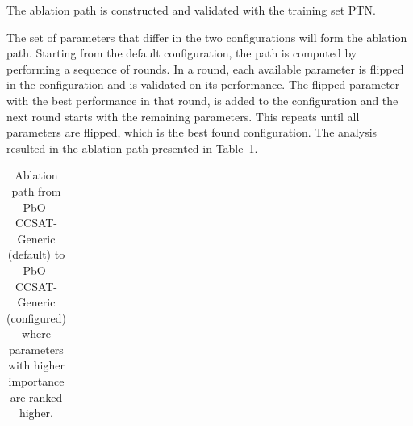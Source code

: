 \documentclass[british]{article}
\newif\iftest
\newif\ifablation
\begin{document}
\ifablation
    \section{Parameter importance via Ablation}

    Ablation analysis~\cite{FawcettHoos16} is performed from the PbO-CCSAT-Generic (default) to PbO-CCSAT-Generic (configured) to see which parameter changes between them contribute most to the improved performance.
    \iftest
    The ablation path uses the training set PTN and validation is perform on the test set PTN2.
    \else
    The ablation path is constructed and validated with the training set PTN.
    \fi
    The set of parameters that differ in the two configurations will form the ablation path.
    Starting from the default configuration, the path is computed by performing a sequence of rounds.
    In a round, each available parameter is flipped in the configuration and is validated on its performance.
    The flipped parameter with the best performance in that round, is added to the configuration and the next round starts with the remaining parameters.
    This repeats until all parameters are flipped, which is the best found configuration.
    The analysis resulted in the ablation path presented in Table~\ref{table:ablationpath}.


    \begin{table}[htbp]
        \caption{Ablation path from PbO-CCSAT-Generic (default) to PbO-CCSAT-Generic (configured) where parameters with higher importance are ranked higher.}
        \label{table:ablationpath}
        \begin{center}
        \footnotesize
            \begin{tabular}{rp{0.25\linewidth}rrr}\end{tabular}
        \end{center}
    \end{table}

\fi %



\end{document}
